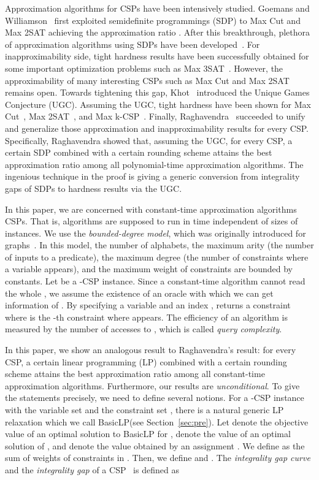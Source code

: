 \documentclass[letterpaper, 11pt]{article}
\newcommand{\blp}{\textsf{BasicLP}\xspace}
\begin{document}
Approximation algorithms for CSPs have been intensively studied.
Goemans and Williamson~\cite{GW95} first exploited semidefinite programmings (SDP) to \textsf{Max Cut} and \textsf{Max 2SAT} achieving the approximation ratio .
After this breakthrough,
plethora of approximation algorithms using SDPs have been developed~\cite{KMS98,LLZ02}.
For inapproximability side,
tight hardness results have been successfully obtained for some important optimization problems such as \textsf{Max 3SAT}~\cite{Has01}.
However,
the approximability of many interesting CSPs such as \textsf{Max Cut} and \textsf{Max 2SAT} remains open.
Towards tightening this gap,
Khot~\cite{Kho02} introduced the Unique Games Conjecture (UGC).
Assuming the UGC,
tight hardness have been shown for \textsf{Max Cut}~\cite{KKMO04}, \textsf{Max 2SAT}~\cite{Aus07},
and \textsf{Max k-CSP}~\cite{AM08,ST06}.
Finally, 
Raghavendra~\cite{Rag08} succeeded to unify and generalize those approximation and inapproximability results for every CSP.
Specifically, Raghavendra showed that,
assuming the UGC,
for every CSP, 
a certain SDP combined with a certain rounding scheme attains the best approximation ratio among all polynomial-time approximation algorithms.
The ingenious technique in the proof is giving a generic conversion from integrality gaps of SDPs to hardness results via the UGC.

In this paper,
we are concerned with constant-time approximation algorithms CSPs.
That is, algorithms are supposed to run in time independent of sizes of instances.
We use the \textit{bounded-degree model},
which was originally introduced for graphs~\cite{GR08}.
In this model,
the number of alphabets, 
the maximum arity (the number of inputs to a predicate),
the maximum degree (the number of constraints where a variable appears),
and the maximum weight of constraints are bounded by constants.
Let  be a -CSP instance.
Since a constant-time algorithm cannot read the whole ,
we assume the existence of an oracle  with which we can get information of .
By specifying a variable  and an index ,  returns a constraint  where  is the -th constraint where  appears.
The efficiency of an algorithm is measured by the number of accesses to , which is called \textit{query complexity}.

In this paper, we show an analogous result to Raghavendra's result:
for every CSP,
a certain linear programming (LP) combined with a certain rounding scheme attains the best approximation ratio among all constant-time approximation algorithms.
Furthermore, our results are \textit{unconditional}.
To give the statements precisely, 
we need to define several notions.
For a -CSP instance  with the variable set  and the constraint set ,
there is a natural generic LP relaxation which we call \blp (see Section~\ref{sec:pre}).
Let  denote the objective value of an optimal solution to \blp for ,
 denote the value of an optimal solution of ,
and  denote the value obtained by an assignment .
We define  as the sum of weights of constraints in .
Then, we define  and .
The \textit{integrality gap curve}  and the \textit{integrality gap}  of a CSP~ is defined as 
\end{document}
